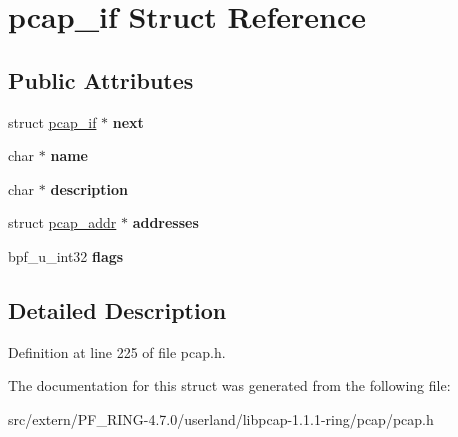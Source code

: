 \hypertarget{structpcap__if}{
\section{pcap\_\-if Struct Reference}
\label{structpcap__if}
}
\subsection*{Public Attributes}
\begin{DoxyCompactItemize}
\item 
\hypertarget{structpcap__if_a961087ccc17affab6fee60fe67d3d50f}{
struct \hyperlink{structpcap__if}{pcap\_\-if} $\ast$ {\bfseries next}}
\label{structpcap__if_a961087ccc17affab6fee60fe67d3d50f}

\item 
\hypertarget{structpcap__if_a24ed20e7ed6d927fbc059377bba3dd40}{
char $\ast$ {\bfseries name}}
\label{structpcap__if_a24ed20e7ed6d927fbc059377bba3dd40}

\item 
\hypertarget{structpcap__if_ad7d5aae851dbe9ccfbb8d33313beeab6}{
char $\ast$ {\bfseries description}}
\label{structpcap__if_ad7d5aae851dbe9ccfbb8d33313beeab6}

\item 
\hypertarget{structpcap__if_ae3ab29848f42530a98bfd597d4383379}{
struct \hyperlink{structpcap__addr}{pcap\_\-addr} $\ast$ {\bfseries addresses}}
\label{structpcap__if_ae3ab29848f42530a98bfd597d4383379}

\item 
\hypertarget{structpcap__if_a5b4f9e239914b126dfc77b1d31101db9}{
bpf\_\-u\_\-int32 {\bfseries flags}}
\label{structpcap__if_a5b4f9e239914b126dfc77b1d31101db9}

\end{DoxyCompactItemize}


\subsection{Detailed Description}


Definition at line 225 of file pcap.h.



The documentation for this struct was generated from the following file:\begin{DoxyCompactItemize}
\item 
src/extern/PF\_\-RING-\/4.7.0/userland/libpcap-\/1.1.1-\/ring/pcap/pcap.h\end{DoxyCompactItemize}
